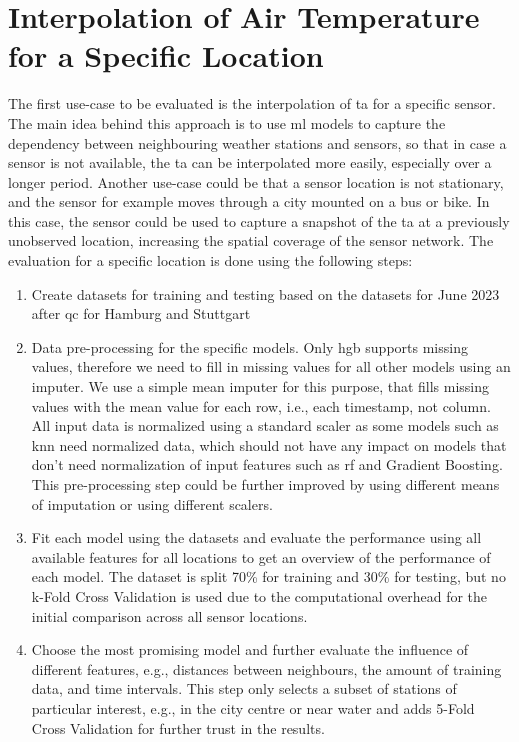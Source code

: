 \section{Interpolation of Air Temperature for a Specific Location}

The first use-case to be evaluated is the interpolation of \gls{ta} for a specific sensor. The main idea behind this approach is to use \gls{ml} models to capture the dependency between neighbouring weather stations and sensors, so that in case a sensor is not available, the \gls{ta} can be interpolated more easily, especially over a longer period. Another use-case could be that a sensor location is not stationary, and the sensor for example moves through a city mounted on a bus or bike. In this case, the sensor could be used to capture a snapshot of the \gls{ta} at a previously unobserved location, increasing the spatial coverage of the sensor network. The evaluation for a specific location is done using the following steps:

\begin{enumerate}
  \item Create datasets for training and testing based on the datasets for June 2023 after \gls{qc} for Hamburg and Stuttgart
  \item Data pre-processing for the specific models. Only \gls{hgb} supports missing values, therefore we need to fill in missing values for all other models using an imputer. We use a simple mean imputer for this purpose, that fills missing values with the mean value for each row, i.e., each timestamp, not column. All input data is normalized using a standard scaler as some models such as \gls{knn} need normalized data, which should not have any impact on models that don't need normalization of input features such as \gls{rf} and Gradient Boosting. This pre-processing step could be further improved by using different means of imputation or using different scalers.
  \item Fit each model using the datasets and evaluate the performance using all available features for all locations to get an overview of the performance of each model. The dataset is split 70\% for training and 30\% for testing, but no k-Fold Cross Validation is used due to the computational overhead for the initial comparison across all sensor locations.
  \item Choose the most promising model and further evaluate the influence of different features, e.g., distances between neighbours, the amount of training data, and time intervals. This step only selects a subset of stations of particular interest, e.g., in the city centre or near water and adds 5-Fold Cross Validation for further trust in the results.
\end{enumerate}

